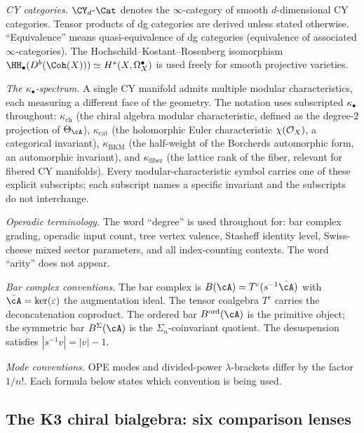 \emph{CY categories.} $\CY_d$-$\Cat$ denotes the
$\infty$-category of smooth $d$-dimensional CY categories.
Tensor products of dg categories are derived unless stated
otherwise. ``Equivalence'' means quasi-equivalence of dg
categories (equivalence of associated $\infty$-categories).
The Hochschild--Kostant--Rosenberg isomorphism
$\HH_\bullet(D^b(\Coh(X))) \simeq H^*(X, \Omega^\bullet_X)$
is used freely for smooth projective varieties.

\emph{The $\kappa_\bullet$-spectrum.} A single CY manifold
admits multiple modular characteristics, each measuring a
different face of the geometry. The notation uses subscripted
$\kappa_\bullet$ throughout: $\kappa_{\mathrm{ch}}$ (the
chiral algebra modular characteristic, defined as
the degree-$2$ projection of $\Theta_\cA$),
$\kappa_{\mathrm{cat}}$ (the holomorphic Euler characteristic
$\chi(\mathcal{O}_X)$, a categorical invariant),
$\kappa_{\mathrm{BKM}}$ (the half-weight of the Borcherds
automorphic form, an automorphic invariant), and
$\kappa_{\mathrm{fiber}}$ (the lattice rank of the fiber,
relevant for fibered CY manifolds). Every modular-characteristic
symbol carries one of these explicit subscripts; each
subscript names a specific invariant and the subscripts do not
interchange.

\emph{Operadic terminology.} The word
``degree'' is used throughout for: bar complex grading,
operadic input count, tree vertex valence, Stasheff identity
level, Swiss-cheese mixed sector parameters, and all
index-counting contexts. The word ``arity'' does not appear.

\emph{Bar complex conventions.} The bar complex is
$B(\cA) = T^c(s^{-1} \bar{\cA})$ with
$\bar{\cA} = \ker(\varepsilon)$ the augmentation ideal. The
tensor coalgebra $T^c$ carries the deconcatenation coproduct.
The ordered bar $B^{\mathrm{ord}}(\cA)$ is the primitive
object; the symmetric bar $B^\Sigma(\cA)$ is the
$\Sigma_n$-coinvariant quotient. The desuspension satisfies
$|s^{-1} v| = |v| - 1$.

\emph{Mode conventions.} OPE modes and divided-power
\(\lambda\)-brackets differ by the factor \(1/n!\). Each formula below
states which convention is being used.

\subsection*{The K3 chiral bialgebra: six comparison lenses}

